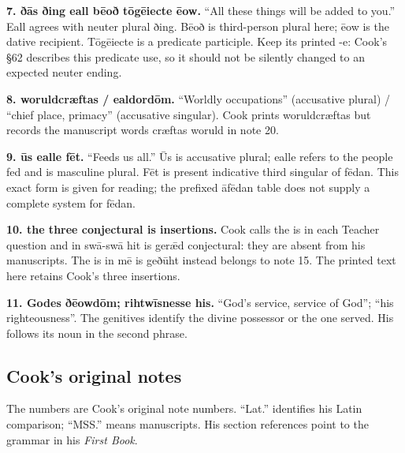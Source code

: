 \textbf{7. ðās ðing eall bēoð tōgēiecte ēow.} “All these things will be added to you.” Eall agrees with neuter plural ðing. Bēoð is third-person plural here; ēow is the dative recipient. Tōgēiecte is a predicate participle. Keep its printed -e: Cook’s §62 describes this predicate use, so it should not be silently changed to an expected neuter ending.

\textbf{8. woruldcræftas /\allowbreak{} ealdordōm.} “Worldly occupations” (accusative plural) /\allowbreak{} “chief place, primacy” (accusative singular). Cook prints woruldcræftas but records the manuscript words cræftas woruld in note 20.

\textbf{9. ūs ealle fēt.} “Feeds us all.” Ūs is accusative plural; ealle refers to the people fed and is masculine plural. Fēt is present indicative third singular of fēdan. This exact form is given for reading; the prefixed āfēdan table does not supply a complete system for fēdan.

\textbf{10. the three conjectural is insertions.} Cook calls the is in each Teacher question and in swā-swā hit is gerǣd conjectural: they are absent from his manuscripts. The is in mē is geðūht instead belongs to note 15. The printed text here retains Cook’s three insertions.

\textbf{11. Godes ðēowdōm; rihtwīsnesse his.} “God’s service, service of God”; “his righteousness”. The genitives identify the divine possessor or the one served. His follows its noun in the second phrase.

\subsection*{Cook’s original notes}

The numbers are Cook’s original note numbers. “Lat.” identifies his Latin comparison; “MSS.” means manuscripts. His section references point to the grammar in his \emph{First Book}.

